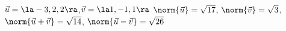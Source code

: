 {$\vec u=\la -3,2,2\ra$,\quad $\vec v = \la 1,-1,1\ra$
}
{$\norm{\vec u} = \sqrt{17}$, $\norm{\vec v} = \sqrt{3}$, $\norm{\vec u+\vec v} = \sqrt{14}$, $\norm{\vec u-\vec v} = \sqrt{26}$
}
